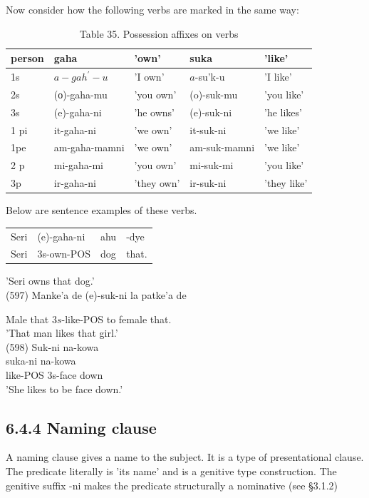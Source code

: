 \documentclass[10pt]{article}
\begin{document}
Now consider how the following verbs are marked in the same way:

\begin{table}[h]
\begin{center}
\captionsetup{labelformat=empty}
\caption{Table 35. Possession affixes on verbs}
\begin{tabular}{|l|l|l|l|l|}
\hline
person & gaha & 'own' & suka & 'like' \\
\hline
1s & \(a-g a h^{\prime}-u\) & 'I own' & \(a\)-su'k-u & 'I like' \\
\hline
2s & (о)-gaha-mu & 'you own' & (o)-suk-mu & 'you like' \\
\hline
3s & (e)-gaha-ni & 'he owns' & (e)-suk-ni & 'he likes' \\
\hline
1 pi & it-gaha-ni & 'we own' & it-suk-ni & 'we like' \\
\hline
1pe & am-gaha-mamni & 'we own' & am-suk-mamni & 'we like' \\
\hline
2 p & mi-gaha-mi & 'you own' & mi-suk-mi & 'you like' \\
\hline
3p & ir-gaha-ni & 'they own' & ir-suk-ni & 'they like' \\
\hline
\end{tabular}
\end{center}
\end{table}

Below are sentence examples of these verbs.

\begin{center}
\begin{tabular}{llll}
Seri & (e)-gaha-ni & ahu & -dye \\
Seri & 3s-own-POS & dog & that. \\
\end{tabular}
\end{center}

'Seri owns that dog.'\\
(597) Manke'a de (e)-suk-ni la patke'a de

Male that \(3 s\)-like-POS to female that.\\
'That man likes that girl.'\\
(598) Suk-ni na-kowa\\
suka-ni na-kowa\\
like-POS 3s-face down\\
'She likes to be face down.'

\subsection*{6.4.4 Naming clause}
A naming clause gives a name to the subject. It is a type of presentational clause. The predicate literally is 'its name' and is a genitive type construction. The genitive suffix -ni makes the predicate structurally a nominative (see §3.1.2)
\end{document}
